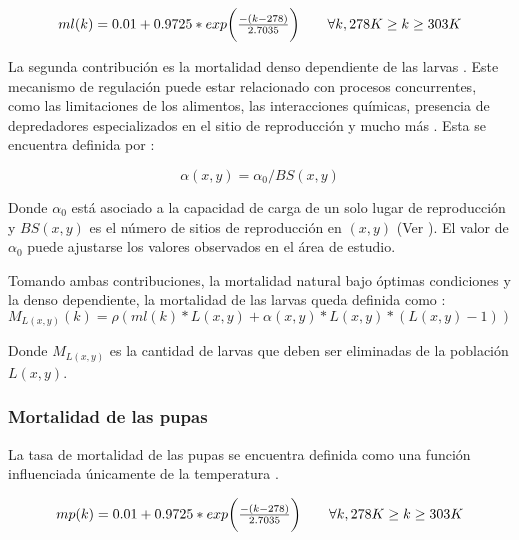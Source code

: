 \begin{equation}
\label{eq:mortalidad-natural-larvas}
 \begin{array}{l l}
    ml(k) = 0.01 + 0.9725 * exp\bigg( \frac{-(k - 278)}{2.7035}\bigg) &\quad  \forall k, 278 K \geq k \geq 303 K\\
\end{array}
\end{equation}

La segunda contribución es la mortalidad denso dependiente de las larvas \cite{otero2006stochastic}
. Este mecanismo de regulación puede estar relacionado con procesos concurrentes, como las
limitaciones de los alimentos, las interacciones químicas, presencia de depredadores
especializados en el sitio de reproducción y mucho más \cite{otero2006stochastic}. Esta se
encuentra definida por :

\begin{equation}
  \alpha (x,y) = \alpha _{0}/BS(x,y)
\end{equation}

Donde $\alpha _{0}$ está asociado a la capacidad de carga de un solo lugar de reproducción y
$BS(x,y)$ es el número de sitios de reproducción en $(x,y)$ (Ver
). El valor de $\alpha _{0}$ puede ajustarse los
valores observados en el área de estudio.

Tomando ambas contribuciones, la mortalidad natural bajo óptimas condiciones y la denso
dependiente, la mortalidad de las larvas queda definida como :
\begin{equation}
    M_{L(x,y)}(k) = \rho(ml(k) * L(x,y) + \alpha (x,y) * L(x,y) *(L(x,y) - 1))
\end{equation}

Donde $M_{L(x,y)}$ es la cantidad de larvas que deben ser eliminadas de la población $L(x,y)$.

\subsubsection{Mortalidad de las pupas}
La tasa de mortalidad de las pupas se encuentra definida como una función influenciada únicamente
de la temperatura \cite{otero2006stochastic}.

\begin{equation}
\label{eq:mortalidad-natural-pupas}
 \begin{array}{l l}
    mp(k) = 0.01 + 0.9725 * exp\bigg( \frac{-(k - 278)}{2.7035}\bigg) &\quad  \forall k, 278 K \geq k \geq 303 K\\
\end{array}
\end{equation}

